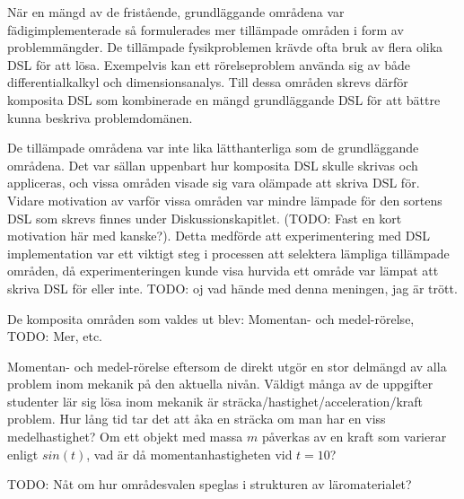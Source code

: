 \begin{binge}
\begin{draft}
  \begin{binge}
    När en mängd av de fristående, grundläggande områdena var
    fädigimplementerade så formulerades mer tillämpade områden i form
    av problemmängder. De tillämpade fysikproblemen krävde ofta bruk
    av flera olika DSL för att lösa. Exempelvis kan ett rörelseproblem
    använda sig av både differentialkalkyl och dimensionsanalys.  Till
    dessa områden skrevs därför komposita DSL som kombinerade en mängd
    grundläggande DSL för att bättre kunna beskriva problemdomänen.

    De tillämpade områdena var inte lika lätthanterliga som de
    grundläggande områdena. Det var sällan uppenbart hur komposita DSL
    skulle skrivas och appliceras, och vissa områden visade sig vara
    olämpade att skriva DSL för. Vidare motivation av varför vissa
    områden var mindre lämpade för den sortens DSL som skrevs finnes
    under Diskussionskapitlet. (TODO: Fast en kort motivation här med
    kanske?). Detta medförde att experimentering med DSL
    implementation var ett viktigt steg i processen att selektera lämpliga
    tillämpade områden, då experimenteringen kunde visa hurvida ett område
    var lämpat att skriva DSL för eller inte. TODO: oj vad hände med
    denna meningen, jag är trött.
  \end{binge}

  De komposita områden som valdes ut blev: Momentan- och
  medel-rörelse, TODO: Mer, etc.

  Momentan- och medel-rörelse eftersom de direkt utgör en stor delmängd
  av alla problem inom mekanik på den aktuella nivån. Väldigt många av
  de uppgifter studenter lär sig lösa inom mekanik är
  sträcka/hastighet/acceleration/kraft problem. Hur lång tid tar det att åka en
  sträcka om man har en viss medelhastighet? Om ett objekt med massa $m$
  påverkas av en kraft som varierar enligt $sin(t)$, vad är då
  momentanhastigheten vid $t=10$?
\end{draft}

TODO: Nåt om hur områdesvalen speglas i strukturen av läromaterialet?

\end{binge}

